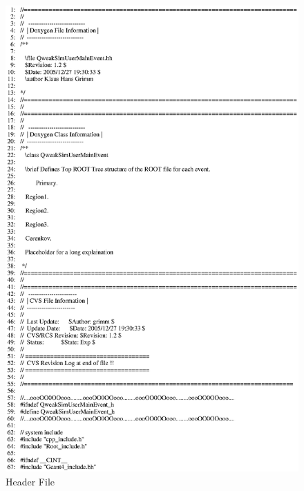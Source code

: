 \clearpage

\begin{figure}[h]
  \hspace{0cm}
  \includegraphics[scale=0.8]{./figures13/QweakSimUserMainEvent.hh-p1.eps}
  \caption{Header File}
           \label{fig:XIII-SC-6}
\end{figure}

\clearpage

